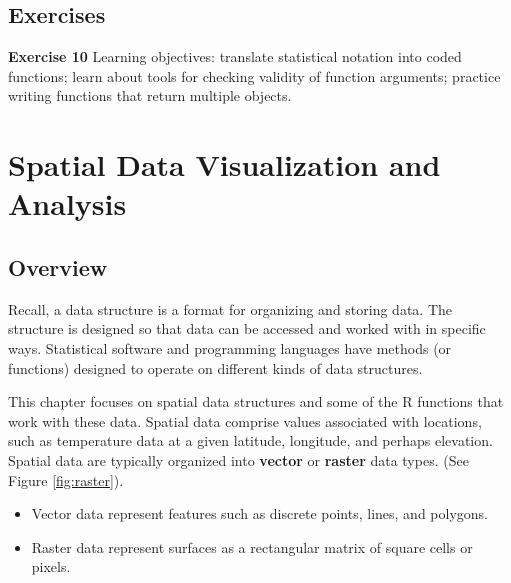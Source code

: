 \documentclass[
]{krantz}
\providecommand{\tightlist}{%
  \setlength{\itemsep}{0pt}\setlength{\parskip}{0pt}}
\begin{document}
\hypertarget{ch7Ex}{%
\section{Exercises}\label{ch7Ex}}

\textbf{Exercise 10} Learning objectives: translate statistical notation into coded functions; learn about tools for checking validity of function arguments; practice writing functions that return multiple objects.

\hypertarget{sp}{%
\chapter{Spatial Data Visualization and Analysis}\label{sp}}

\hypertarget{overview}{%
\section{Overview}\label{overview}}

Recall, a data structure is a format for organizing and storing data. The structure is designed so that data can be accessed and worked with in specific ways. Statistical software and programming languages have methods (or functions) designed to operate on different kinds of data structures.

This chapter focuses on spatial data structures and some of the R functions that work with these data. Spatial data comprise values associated with locations, such as temperature data at a given latitude, longitude, and perhaps elevation. Spatial data are typically organized into \textbf{vector} or \textbf{raster} data types. (See Figure \ref{fig:raster}).

\begin{itemize}
\tightlist
\item
  Vector data represent features such as discrete points, lines, and polygons.
\item
  Raster data represent surfaces as a rectangular matrix of square cells or pixels.
\end{itemize}
\end{document}
